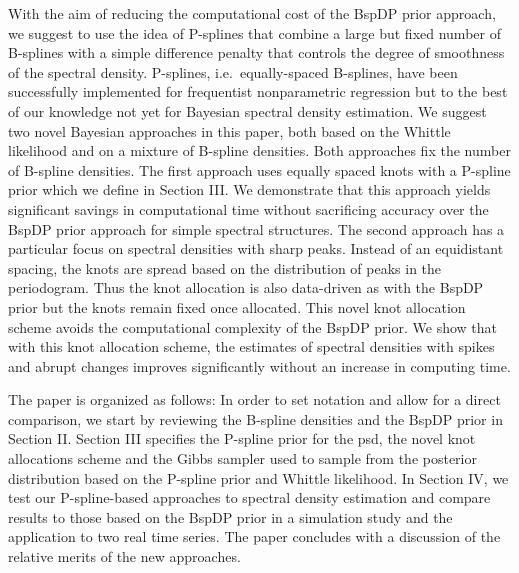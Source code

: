 \documentclass[twocolumn,final]{svjour3}
\begin{document}
With the aim of reducing the computational cost of the BspDP prior approach,  we suggest to use the idea of P-splines \cite{Eilers:1996} that combine a large but fixed number of  B-splines with a simple difference penalty that controls the degree of  smoothness of the spectral density. P-splines, i.e.\  equally-spaced B-splines,  have been successfully implemented for frequentist nonparametric regression but to the best of our knowledge not yet for Bayesian spectral density estimation. We suggest 
two novel Bayesian  approaches in this paper, both based on the Whittle likelihood and on a mixture of B-spline densities. Both approaches fix the  number of B-spline densities. 
The first approach uses equally spaced knots with a P-spline prior which we define in Section III. We demonstrate that this approach yields significant savings in computational time without sacrificing accuracy over the BspDP prior approach for simple spectral structures.  The second approach has a particular  focus on spectral densities with sharp peaks. Instead of an equidistant spacing, the knots are spread based on the distribution of peaks in the periodogram. Thus the knot allocation is also data-driven as with the BspDP prior but the knots  remain fixed once
allocated. This novel knot allocation scheme avoids the computational complexity of the BspDP prior.  We show that with this knot allocation scheme, the estimates of spectral densities with spikes and abrupt changes improves significantly without an increase in computing time.



The paper is organized as follows: In order to set notation and allow for a direct comparison, we start by
reviewing the B-spline densities and the BspDP prior in Section II. Section III specifies the P-spline prior for the psd, the novel knot allocations scheme and the Gibbs sampler used to sample from the posterior distribution based on the P-spline prior and Whittle likelihood.  In Section IV, we test our P-spline-based approaches to spectral density estimation and compare results to those based on the BspDP prior in a simulation study and the application to two real time series. The paper concludes with a discussion of the relative merits of the new approaches.
\end{document}
